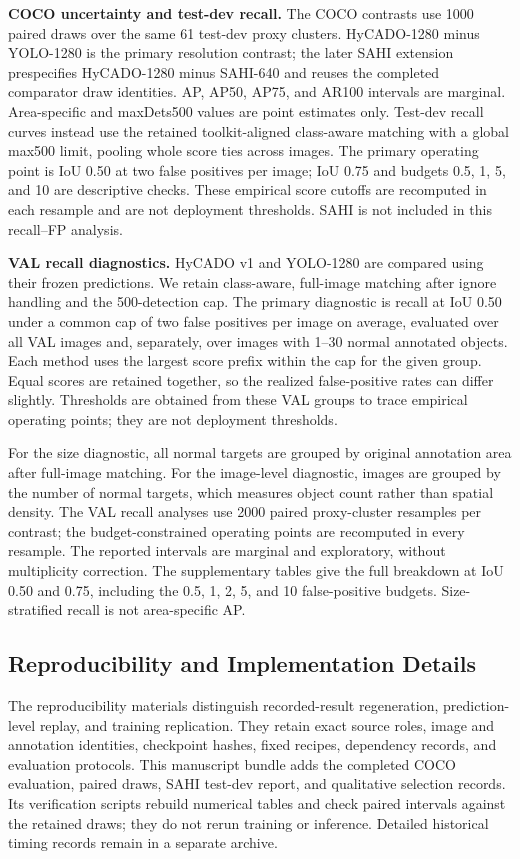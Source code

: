 \documentclass[journal]{IEEEtran}
\begin{document}
\textbf{COCO uncertainty and test-dev recall.} The COCO contrasts use 1000 paired draws over the same 61 test-dev proxy clusters. HyCADO-1280 minus YOLO-1280 is the primary resolution contrast; the later SAHI extension prespecifies HyCADO-1280 minus SAHI-640 and reuses the completed comparator draw identities. AP, AP50, AP75, and AR100 intervals are marginal. Area-specific and maxDets500 values are point estimates only. Test-dev recall curves instead use the retained toolkit-aligned class-aware matching with a global max500 limit, pooling whole score ties across images. The primary operating point is IoU 0.50 at two false positives per image; IoU 0.75 and budgets 0.5, 1, 5, and 10 are descriptive checks. These empirical score cutoffs are recomputed in each resample and are not deployment thresholds. SAHI is not included in this recall--FP analysis.

\textbf{VAL recall diagnostics.} HyCADO v1 and YOLO-1280 are compared using their frozen predictions. We retain class-aware, full-image matching after ignore handling and the 500-detection cap. The primary diagnostic is recall at IoU 0.50 under a common cap of two false positives per image on average, evaluated over all VAL images and, separately, over images with 1--30 normal annotated objects. Each method uses the largest score prefix within the cap for the given group. Equal scores are retained together, so the realized false-positive rates can differ slightly. Thresholds are obtained from these VAL groups to trace empirical operating points; they are not deployment thresholds.

For the size diagnostic, all normal targets are grouped by original annotation area after full-image matching. For the image-level diagnostic, images are grouped by the number of normal targets, which measures object count rather than spatial density. The VAL recall analyses use 2000 paired proxy-cluster resamples per contrast; the budget-constrained operating points are recomputed in every resample. The reported intervals are marginal and exploratory, without multiplicity correction. The supplementary tables give the full breakdown at IoU 0.50 and 0.75, including the 0.5, 1, 2, 5, and 10 false-positive budgets. Size-stratified recall is not area-specific AP.

\subsection{Reproducibility and Implementation Details}
The reproducibility materials distinguish recorded-result regeneration, prediction-level replay, and training replication. They retain exact source roles, image and annotation identities, checkpoint hashes, fixed recipes, dependency records, and evaluation protocols. This manuscript bundle adds the completed COCO evaluation, paired draws, SAHI test-dev report, and qualitative selection records. Its verification scripts rebuild numerical tables and check paired intervals against the retained draws; they do not rerun training or inference. Detailed historical timing records remain in a separate archive.
\end{document}
